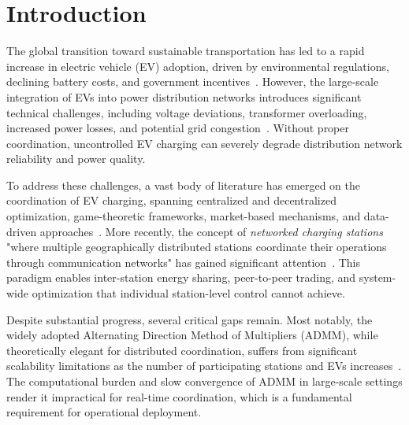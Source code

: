 \documentclass[review]{elsarticle}
\begin{document}
\section{Introduction}\label{sec:intro}

\hspace{0.5cm}The global transition toward sustainable transportation has led to a rapid increase in electric vehicle (EV) adoption, driven by environmental regulations, declining battery costs, and government incentives~\cite{saber2011plugin,pieltain2011assessment}. However, the large-scale integration of EVs into power distribution networks introduces significant technical challenges, including voltage deviations, transformer overloading, increased power losses, and potential grid congestion~\cite{akhavan2012uncoordinated,etezadi2010rapid}. Without proper coordination, uncontrolled EV charging can severely degrade distribution network reliability and power quality.

\hspace{0.5cm}To address these challenges, a vast body of literature has emerged on the coordination of EV charging, spanning centralized and decentralized optimization, game-theoretic frameworks, market-based mechanisms, and data-driven approaches~\cite{sadeghian2022comprehensive,chandra2024comprehensive}. More recently, the concept of \textit{networked charging stations} "where multiple geographically distributed stations coordinate their operations through communication networks" has gained significant attention~\cite{zhang2022distributed,motlagh2025applied}. This paradigm enables inter-station energy sharing, peer-to-peer trading, and system-wide optimization that individual station-level control cannot achieve.

\hspace{0.5cm}Despite substantial progress, several critical gaps remain. Most notably, the widely adopted Alternating Direction Method of Multipliers (ADMM), while theoretically elegant for distributed coordination, suffers from significant scalability limitations as the number of participating stations and EVs increases~\cite{boyd2010admm,zhang2022distributed}. The computational burden and slow convergence of ADMM in large-scale settings render it impractical for real-time coordination, which is a fundamental requirement for operational deployment.
\end{document}

